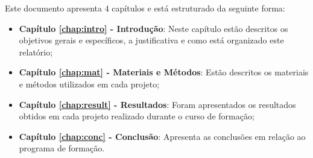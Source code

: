 Este documento apresenta $4$ capítulos e está estruturado da seguinte forma:

\begin{itemize}

  \item \textbf{Capítulo \ref{chap:intro} - Introdução}: Neste capítulo estão descritos os objetivos gerais e específicos, a justificativa e como está organizado este relatório;
  \item \textbf{Capítulo \ref{chap:mat} - Materiais e Métodos}: Estão descritos os materiais e métodos utilizados em cada projeto;
  \item \textbf{Capítulo \ref{chap:result} - Resultados}: Foram apresentados os resultados obtidos em cada projeto realizado durante o curso de formação;
  \item \textbf{Capítulo \ref{chap:conc} - Conclusão}: Apresenta as conclusões em relação ao programa de formação.

\end{itemize}